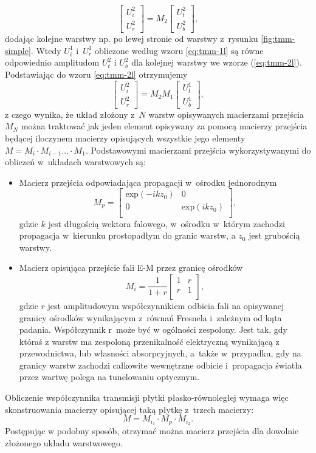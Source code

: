 \begin{equation}
	\begin{bmatrix}
	U_i^2 \\ 
	U_r^2
	\end{bmatrix}
	= M_2 
	\begin{bmatrix}
	U_t^2 \\
	U_b^2
	\end{bmatrix},
\label{eq:tmm-2l}
\end{equation}
dodając kolejne warstwy np. po lewej stronie od warstwy z~rysunku \ref{fig:tmm-simple}. Wtedy $U_i^1$ i~$U_r^1$ obliczone według wzoru \ref{eq:tmm-1l} są równe odpowiednio amplitudom $U_t^2$ i $U_b^2$ dla kolejnej warstwy we wzorze (\ref{eq:tmm-2l}). Podstawiając do wzoru \ref{eq:tmm-2l} otrzymujemy 
\begin{equation}
\begin{bmatrix}
U_i^2 \\ 
U_r^2
\end{bmatrix}
=M_2 M_1 
\begin{bmatrix}
U_t^1 \\
U_b^1
\end{bmatrix},
\label{eq:tmm-2ls}
\end{equation}
z czego wynika, że układ złożony z~$N$ warstw opisywanych macierzami przejścia $M_N$ można traktować jak jeden element opisywany za pomocą macierzy przejścia będącej iloczynem macierzy opisujących wszystkie jego elementy $M= M_i \cdot M_{i-1} ... \cdot M_1$. Podstawowymi macierzami przejścia wykorzystywanymi do obliczeń w~układach warstwowych są:
\begin{itemize}
\item Macierz przejścia odpowiadająca propagacji w~ośrodku jednorodnym 
\begin{equation}
	M_p=
	\begin{bmatrix}
	\textrm{exp}(-i k z_0) & 0 \\
	0	&\textrm{exp}(i k z_0)\\
	\end{bmatrix},
\end{equation}
gdzie $k$ jest długością wektora falowego, w~ośrodku w~którym zachodzi propagacja w~kierunku prostopadłym do granic warstw, a $z_0$ jest grubością warstwy.
\item Macierz opisująca przejście fali E-M przez granicę ośrodków
\begin{equation}
	M_i=\frac{1}{1+r}
	\begin{bmatrix}
	1 &  r \\
	 r & 1\\
	\end{bmatrix},
\end{equation}
gdzie $r$ jest amplitudowym współczynnikiem odbicia fali na opisywanej granicy ośrodków wynikającym z~równań Fresnela i~zależnym od kąta padania. Współczynnik r~może być w ogólności zespolony. Jest tak, gdy któraś z warstw ma zespoloną przenikalność elektryczną wynikającą z przewodnictwa, lub własności absorpcyjnych, a~także w~przypadku, gdy na granicy warstw zachodzi całkowite wewnętrzne odbicie i~propagacja światła przez wartwę polega na tunelowaniu optycznym.
\end{itemize}

Obliczenie współczynnika transmisji płytki płasko-równoległej wymaga więc skonstruowania macierzy opisującej taką płytkę z~trzech macierzy: 
\[
M=M_{i_1} \cdot M_p \cdot  M_{i_2}.
\]
Postępując w podobny sposób, otrzymać można macierz przejścia dla dowolnie złożonego układu warstwowego. 
